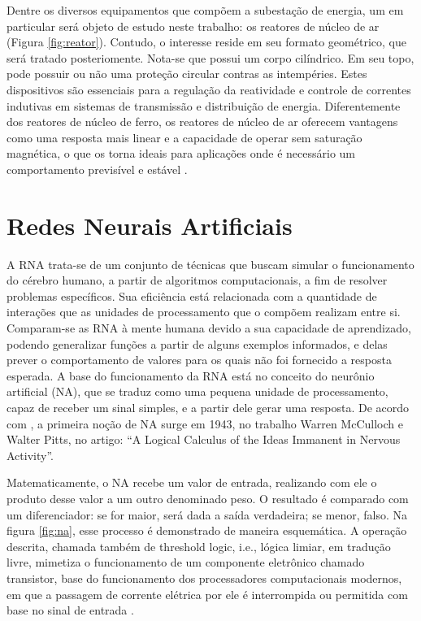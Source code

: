 Dentre os diversos equipamentos que compõem a subestação de energia, um em particular será objeto de estudo neste trabalho: os reatores de núcleo de ar (Figura \ref{fig:reator}). Contudo, o interesse reside em seu formato geométrico, que será tratado posteriomente. Nota-se que possui um corpo cilíndrico. Em seu topo, pode possuir ou não uma proteção circular contras as intempéries. Estes dispositivos são essenciais para a regulação da reatividade e controle de correntes indutivas em sistemas de transmissão e distribuição de energia. Diferentemente dos reatores de núcleo de ferro, os reatores de núcleo de ar oferecem vantagens como uma resposta mais linear e a capacidade de operar sem saturação magnética, o que os torna ideais para aplicações onde é necessário um comportamento previsível e estável \cite{de2012reatores}. 

\section{Redes Neurais Artificiais}
\label{sec:redesneurais}

A RNA trata-se de um conjunto de técnicas que buscam simular o funcionamento do cérebro humano, a partir de algoritmos computacionais, a fim de resolver problemas específicos. Sua eficiência está relacionada com a quantidade de interações que as unidades de processamento que o compõem realizam entre si. Comparam-se as RNA à mente humana devido a sua capacidade de aprendizado, podendo generalizar funções a partir de alguns exemplos informados, e delas prever o comportamento de valores para os quais não foi fornecido a resposta esperada. A base do funcionamento da RNA está no conceito do neurônio artificial (NA), que se traduz como uma pequena unidade de processamento, capaz de receber um sinal simples, e a partir dele gerar uma resposta.  De acordo com  \cite{fleck2016redes}, a primeira noção de NA surge em 1943, no trabalho Warren McCulloch e Walter Pitts, no artigo: “A Logical Calculus of the Ideas Immanent in Nervous Activity”.

Matematicamente, o NA recebe um valor de entrada, realizando com ele o produto desse valor a um outro denominado peso. O resultado é comparado com um diferenciador: se for maior, será dada a saída verdadeira; se menor, falso. Na figura \ref{fig:na}, esse processo é demonstrado de maneira esquemática. A operação descrita, chamada também de threshold logic, i.e., lógica limiar, em tradução livre, mimetiza o funcionamento de um componente eletrônico chamado transistor, base do funcionamento dos processadores computacionais modernos, em que a passagem de corrente elétrica por ele é interrompida ou permitida com base no sinal de entrada \cite {mcculloch1943logical}. 

